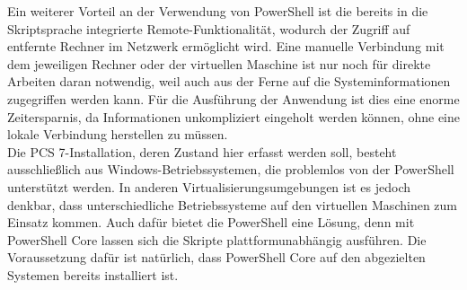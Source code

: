 Ein weiterer Vorteil an der Verwendung von PowerShell ist die bereits in die Skriptsprache integrierte Remote-Funktionalität, wodurch der Zugriff auf entfernte Rechner im Netzwerk ermöglicht wird. Eine manuelle Verbindung mit dem jeweiligen Rechner oder der virtuellen Maschine ist nur noch für direkte Arbeiten daran notwendig, weil auch aus der Ferne auf die Systeminformationen zugegriffen werden kann. Für die Ausführung der Anwendung ist dies eine enorme Zeitersparnis, da Informationen unkompliziert eingeholt werden können, ohne eine lokale Verbindung herstellen zu müssen.\medskip\\
Die PCS 7-Installation, deren Zustand hier erfasst werden soll, besteht ausschließlich aus Windows-Betriebssystemen, die problemlos von der PowerShell unterstützt werden. In anderen Virtualisierungsumgebungen ist es jedoch denkbar, dass unterschiedliche Betriebssysteme auf den virtuellen Maschinen zum Einsatz kommen. Auch dafür bietet die PowerShell eine Lösung, denn mit PowerShell Core lassen sich die Skripte plattformunabhängig ausführen. Die Voraussetzung dafür ist natürlich, dass PowerShell Core auf den abgezielten Systemen bereits installiert ist.
\begin{comment}
\begin{compactitem}
    \item alles Windows Umgebungen, PS vorinstalliert, zukunftssicher (wird nicht abgelöst wie FlashPlayer z.b. Stand heute, klares Bekenntnis von Microsoft zur PS), keine Installationsfreigabe notwendig (Genehmigungsprozess)
    \item plattformübergreifend möglich (auch evtl. Linux distributionen können interagieren)
    \item Remote Funktionalität (Fernzugriff auf Rechner mit PS)
    \item PS ist auf Systemadministratoren abgerichtet: viele Funktionen für Administration, Verwaltung, Konfiguration von Systemen
    \item mit Modulen Erweiterbar; öffentliches Repository
    \item auf höchstem Grad konfigurierbar, da kein standardisiertes Tool wie die vorher vorgestellten
    \item vorhandene Schnittstelle zu VMware kann genutzt werden (keine eigene API Entwicklung notwendig)
\end{compactitem}
\end{comment}
\newpage
